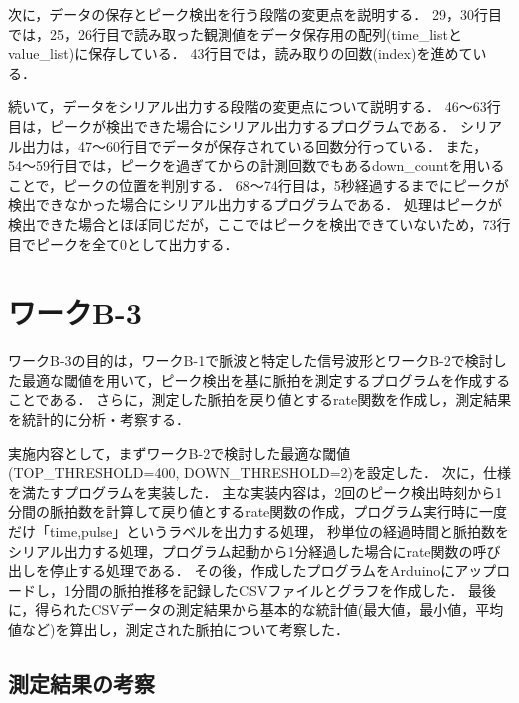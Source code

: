 次に，データの保存とピーク検出を行う段階の変更点を説明する．
29，30行目では，25，26行目で読み取った観測値をデータ保存用の配列(time\_listとvalue\_list)に保存している．
43行目では，読み取りの回数(index)を進めている．

続いて，データをシリアル出力する段階の変更点について説明する．
46〜63行目は，ピークが検出できた場合にシリアル出力するプログラムである．
シリアル出力は，47〜60行目でデータが保存されている回数分行っている．
また，54〜59行目では，ピークを過ぎてからの計測回数でもあるdown\_countを用いることで，ピークの位置を判別する．
68〜74行目は，5秒経過するまでにピークが検出できなかった場合にシリアル出力するプログラムである．
処理はピークが検出できた場合とほぼ同じだが，ここではピークを検出できていないため，73行目でピークを全て0として出力する．

\newpage

\section{ワークB-3}
ワークB-3の目的は，ワークB-1で脈波と特定した信号波形とワークB-2で検討した最適な閾値を用いて，ピーク検出を基に脈拍を測定するプログラムを作成することである．
さらに，測定した脈拍を戻り値とするrate関数を作成し，測定結果を統計的に分析・考察する．

実施内容として，まずワークB-2で検討した最適な閾値(TOP\_THRESHOLD=400, DOWN\_THRESHOLD=2)を設定した．
次に，仕様を満たすプログラムを実装した．
主な実装内容は，2回のピーク検出時刻から1分間の脈拍数を計算して戻り値とするrate関数の作成，プログラム実行時に一度だけ「time,pulse」というラベルを出力する処理，
秒単位の経過時間と脈拍数をシリアル出力する処理，プログラム起動から1分経過した場合にrate関数の呼び出しを停止する処理である．
その後，作成したプログラムをArduinoにアップロードし，1分間の脈拍推移を記録したCSVファイルとグラフを作成した．
最後に，得られたCSVデータの測定結果から基本的な統計値(最大値，最小値，平均値など)を算出し，測定された脈拍について考察した．


\subsection{測定結果の考察}

